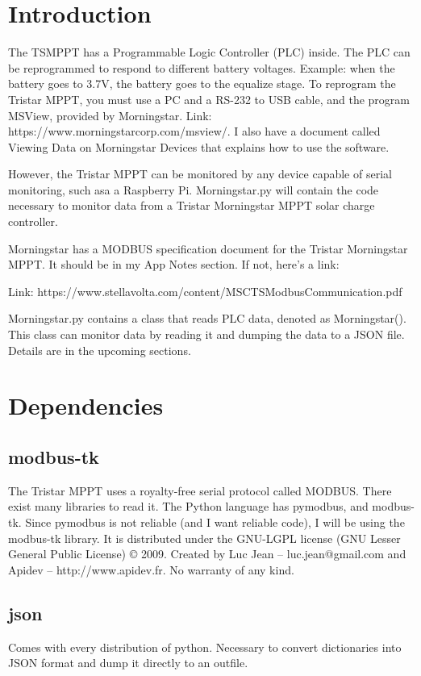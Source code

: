 \section{Introduction}

The TSMPPT has a Programmable Logic Controller (PLC) inside. The PLC can be reprogrammed to respond to different battery voltages. Example: when the battery goes to 3.7V, the battery goes to the equalize stage. To reprogram the Tristar MPPT, you must use a PC and a RS-232 to USB cable, and the program MSView, provided by Morningstar. Link: https://www.morningstarcorp.com/msview/. I also have a document called Viewing Data on Morningstar Devices that explains how to use the software.

However, the Tristar MPPT can be monitored by any device capable of serial monitoring, such asa a Raspberry Pi. Morningstar.py will contain the code necessary to monitor data from a Tristar Morningstar MPPT solar charge controller.

Morningstar has a MODBUS specification document for the Tristar Morningstar MPPT. It should be in my App Notes section. If not, here’s a link:

Link: https://www.stellavolta.com/content/MSCTSModbusCommunication.pdf

Morningstar.py contains a class that reads PLC data, denoted as Morningstar(). This class can monitor data by reading it and dumping the data to a JSON file. Details are in the upcoming sections.

\section{Dependencies}

\subsection{modbus-tk}

The Tristar MPPT uses a royalty-free serial protocol called MODBUS. There exist many libraries to read it. The Python language has pymodbus, and modbus-tk.  Since pymodbus is not reliable (and I want reliable code), I will be using the modbus-tk library. It is distributed under the GNU-LGPL license (GNU Lesser General Public License) © 2009. Created by Luc Jean – luc.jean@gmail.com and Apidev – http://www.apidev.fr. No warranty of any kind.

\subsection{json}
Comes with every distribution of python. Necessary to convert dictionaries into JSON format and dump it directly to an outfile.

